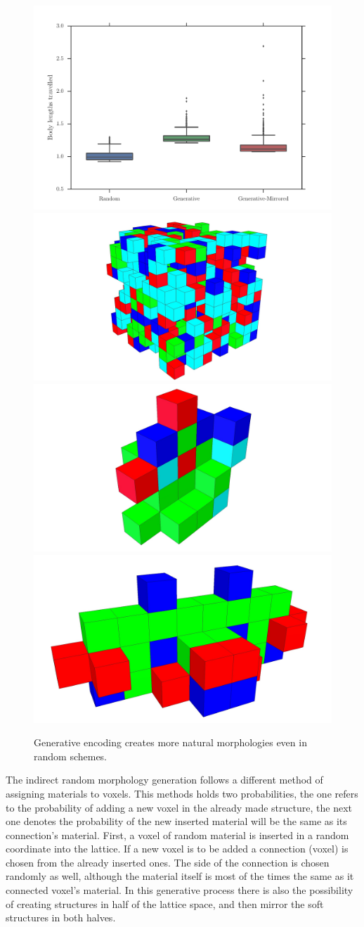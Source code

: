 \begin{figure}
\centering
\includegraphics[width=1.0\textwidth]{../Figures/Results/random.pdf}\\
\hspace{0.1cm}
\includegraphics[height=0.15\textwidth]{../Figures/Robots/random.jpg}
\includegraphics[height=0.15\textwidth]{../Figures/Robots/rg0.jpg}
\includegraphics[height=0.15\textwidth]{../Figures/Robots/rg1.jpg}
\caption{Generative encoding creates more natural morphologies even in random schemes.}
\label{fig:randomResultsRobots}
\end{figure}


The indirect random morphology generation follows a different method of assigning materials to voxels. This methods holds two probabilities, the one refers to the probability of adding a new voxel in the already made structure, the next one denotes the probability of the new inserted material will be the same as its connection's material. First, a voxel of random material is inserted in a random coordinate into the lattice. If a new voxel is to be added a connection (voxel) is chosen from the already inserted ones. The side of the connection is chosen randomly as well, although the material itself is most of the times the same as it connected voxel's material. In this generative process there is also the possibility of creating structures in half of the lattice space, and then mirror the soft structures in both halves.

